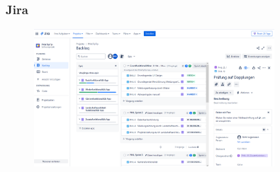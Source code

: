 \begin{frame}
\frametitle{Jira}

\begin{figure}
  \includegraphics[width=0.8\textwidth]{figures/Jira.png}
  \label{fig:jira}
\end{figure}

\end{frame}





